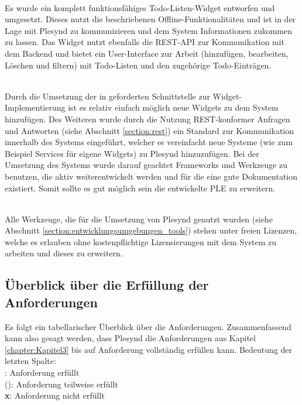 \textbullet{}  \emph{\requirementExampleWidget}\\
Es wurde ein komplett funktionsfähiges Todo-Listen-Widget entworfen und umgesetzt. Dieses nutzt die beschriebenen Offline-Funktionalitäten und ist in der Lage mit Plesynd zu kommunizieren und dem System Informationen zukommen zu lassen. Das Widget nutzt ebenfalls die REST-\ac{API} zur Kommunikation mit dem Backend und bietet ein User-Interface zur Arbeit (hinzufügen, bearbeiten, Löschen und filtern) mit Todo-Listen und den zugehörige Todo-Einträgen.

\textbullet{}  \emph{\requirementExtensibility}\\
Durch die Umsetzung der in  geforderten Schnittstelle zur Widget-Implementierung ist es relativ einfach möglich neue Widgets zu dem System hinzufügen. Des Weiteren wurde durch die Nutzung REST-konformer Anfragen und Antworten (siehe Abschnitt \ref{section:rest}) ein Standard zur Kommunikation innerhalb des Systems eingeführt, welcher es vereinfacht neue Systeme (wie zum Beispiel Services für eigene Widgets) zu Plesynd hinzuzufügen. Bei der Umsetzung des Systems wurde darauf geachtet Frameworks und Werkzeuge zu benutzen, die aktiv weiterentwickelt werden und für die eine gute Dokumentation existiert. Somit sollte es gut möglich sein die entwickelte \ac{PLE} zu erweitern.

\textbullet{}  \emph{\requirementOpenSource}\\
Alle Werkzeuge, die für die Umsetzung von Plesynd genutzt wurden (siehe Abschnitt \ref{section:entwicklungsumgebungen_tools}) stehen unter freien Lizenzen, welche es erlauben ohne kostenpflichtige Lizensierungen mit dem System zu arbeiten und dieses zu erweitern.

\subsection{Überblick über die Erfüllung der Anforderungen}
Es folgt ein tabellarischer Überblick über die Anforderungen. Zusammenfassend kann also gesagt werden, dass Plesynd die Anforderungen aus Kapitel \ref{chapter:Kapitel3} bis auf Anforderung  vollständig erfüllen kann.
Bedeutung der letzten Spalte:\\
\checkmark: Anforderung erfüllt\\
(\checkmark): Anforderung teilweise erfüllt\\
\textbf{x}: Anforderung nicht erfüllt

